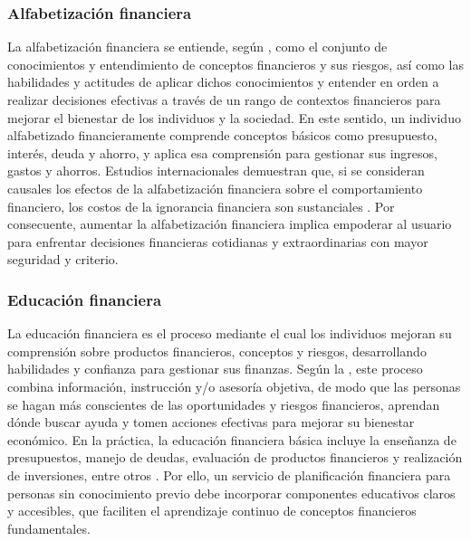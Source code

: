 {}
\subsubsection*{Alfabetización financiera}

La alfabetización financiera se entiende, según \textcite{OECD01}, como el conjunto de conocimientos y entendimiento de conceptos financieros y sus riesgos, así como las habilidades y actitudes de aplicar dichos conocimientos y entender en orden a realizar decisiones efectivas a través de un rango de contextos financieros para mejorar el bienestar de los individuos y la sociedad. En este sentido, un individuo alfabetizado financieramente comprende conceptos básicos como presupuesto, interés, deuda y ahorro, y aplica esa comprensión para gestionar sus ingresos, gastos y ahorros. Estudios internacionales demuestran que, si se consideran causales los efectos de la alfabetización financiera sobre el comportamiento financiero, los costos de la ignorancia financiera son sustanciales \parencite[p.~17]{PMC01}. Por consecuente, aumentar la alfabetización financiera implica empoderar al usuario para enfrentar decisiones financieras cotidianas y extraordinarias con mayor seguridad y criterio.

{}
\subsubsection*{Educación financiera}

La educación financiera es el proceso mediante el cual los individuos mejoran su comprensión sobre productos financieros, conceptos y riesgos, desarrollando habilidades y confianza para gestionar sus finanzas. Según la \textcite{OECD02}, este proceso combina información, instrucción y/o asesoría objetiva, de modo que las personas se hagan más conscientes de las oportunidades y riesgos financieros, aprendan dónde buscar ayuda y tomen acciones efectivas para mejorar su bienestar económico. En la práctica, la educación financiera básica incluye la enseñanza de presupuestos, manejo de deudas, evaluación de productos financieros y realización de inversiones, entre otros \parencite{Investopedia01}. Por ello, un servicio de planificación financiera para personas sin conocimiento previo debe incorporar componentes educativos claros y accesibles, que faciliten el aprendizaje continuo de conceptos financieros fundamentales.

